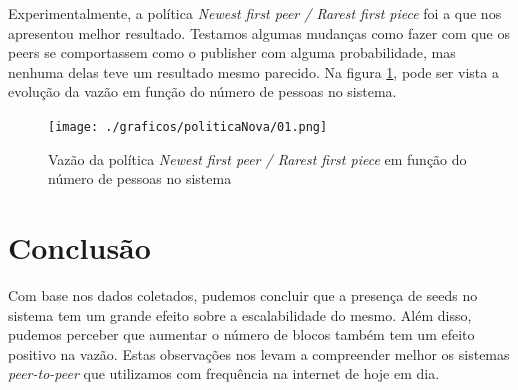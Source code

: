 \documentclass[a4paper,10pt]{article}
\begin{document}
Experimentalmente, a política \textit{Newest first peer / Rarest first piece} foi a que nos apresentou melhor resultado. Testamos algumas mudanças como fazer com que os peers se comportassem como o publisher com alguma probabilidade, mas nenhuma delas teve um resultado mesmo parecido. Na figura \ref{vazaoPoliticaNova}, pode ser vista a evolução da vazão em função do número de pessoas no sistema.

\begin{center}
	\begin{table}[h]
		\caption{Vazão do cenário 5 com população inicial de 50 pessoas de acordo com a política}
		\label{vazaoPorPolitica}
	\end{table}
\end{center}

\pagebreak

\begin{figure}[h]
	\caption{Vazão da política \textit{Newest first peer / Rarest first piece} em função do número de pessoas no sistema}
	\label{vazaoPoliticaNova}
	\texttt{[image: ./graficos/politicaNova/01.png]}
\end{figure}

\clearpage
\pagebreak

\section{Conclusão}

Com base nos dados coletados, pudemos concluir que a presença de seeds no sistema tem um grande efeito sobre a escalabilidade do mesmo. Além disso, pudemos perceber que aumentar o número de blocos também tem um efeito positivo na vazão. Estas observações nos levam a compreender melhor os sistemas \textit{peer-to-peer} que utilizamos com frequência na internet de hoje em dia.
\end{document}
